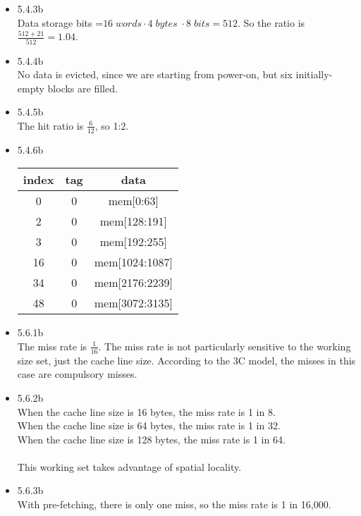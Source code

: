 \documentclass[a4paper]{article}
\begin{document}
\begin{itemize}
\item{5.4.3b} \\
Data storage bits =$16\;words \cdot 4\; bytes \; \cdot 8 \; bits = 512$. So the ratio is $\frac{512+21}{512} = 1.04$. \\


\item{5.4.4b} \\
No data is evicted, since we are starting from power-on, but six initially-empty blocks are filled. \\


\item{5.4.5b} \\
The hit ratio is $\frac{6}{12}$, so 1:2. \\


\item{5.4.6b} \\
\begin{tabular}{c| c| c}
index & tag & data \\
\hline
0 & 0 & mem[0:63]\\
2 & 0 & mem[128:191]\\
3 & 0 & mem[192:255]\\
16 & 0 & mem[1024:1087]\\
34 & 0 & mem[2176:2239]\\
48 & 0 & mem[3072:3135]
\end{tabular}

\item{5.6.1b} \\
The miss rate is $\frac{1}{16}$. The miss rate is not particularly sensitive to the working size set, just the cache line size. According to the 3C model, the misses in this case are compulsory misses. \\


\item{5.6.2b} \\
When the cache line size is 16 bytes, the miss rate is 1 in 8. \\
When the cache line size is 64 bytes, the miss rate is 1 in 32. \\
When the cache line size is 128 bytes, the miss rate is 1 in 64. \\
\\
This working set takes advantage of spatial locality. \\ 


\item{5.6.3b} \\
With pre-fetching, there is only one miss, so the miss rate is 1 in 16,000. \\



\end{itemize}
\end{document}
